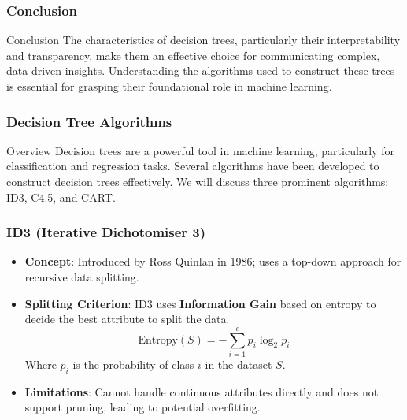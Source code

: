 \documentclass[aspectratio=169]{beamer}
\begin{document}
\begin{frame}[fragile]
    \frametitle{Conclusion}
    \begin{block}{Conclusion}
        The characteristics of decision trees, particularly their interpretability and transparency, make them an effective choice for communicating complex, data-driven insights. Understanding the algorithms used to construct these trees is essential for grasping their foundational role in machine learning.
    \end{block}
\end{frame}

\begin{frame}[fragile]
    \frametitle{Decision Tree Algorithms}
    \begin{block}{Overview}
        Decision trees are a powerful tool in machine learning, particularly for classification and regression tasks. 
        Several algorithms have been developed to construct decision trees effectively. 
        We will discuss three prominent algorithms: ID3, C4.5, and CART.
    \end{block}
\end{frame}

\begin{frame}[fragile]
    \frametitle{ID3 (Iterative Dichotomiser 3)}
    \begin{itemize}
        \item \textbf{Concept}: Introduced by Ross Quinlan in 1986; uses a top-down approach for recursive data splitting.
        \item \textbf{Splitting Criterion}: ID3 uses \textbf{Information Gain} based on entropy to decide the best attribute to split the data.
        \begin{equation}
            \text{Entropy}(S) = -\sum_{i=1}^{c} p_i \log_2 p_i
        \end{equation}
        Where \(p_i\) is the probability of class \(i\) in the dataset \(S\).
        \item \textbf{Limitations}: Cannot handle continuous attributes directly and does not support pruning, leading to potential overfitting.
    \end{itemize}
\end{frame}
\end{document}
